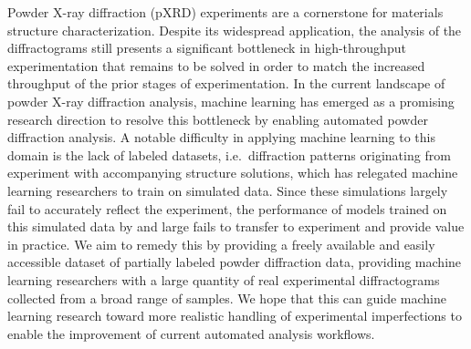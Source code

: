 Powder X-ray diffraction (pXRD) experiments are a cornerstone for materials structure characterization.
Despite its widespread application, the analysis of the diffractograms still presents a significant bottleneck
in high-throughput experimentation that remains to be solved in order to match the increased throughput
of the prior stages of experimentation.
In the current landscape of powder X-ray diffraction analysis, machine learning has emerged as a promising research direction to resolve this bottleneck by enabling automated powder diffraction analysis.
A notable difficulty in applying machine learning to this domain is the lack of labeled datasets, i.e.\
diffraction patterns originating from experiment with accompanying structure solutions, which has relegated machine learning
researchers to train on simulated data.
Since these simulations largely fail to accurately reflect the experiment, the performance of models trained
on this simulated data by and large fails to transfer to experiment and provide value in practice.
We aim to remedy this by providing a freely available and easily accessible dataset of partially labeled
powder diffraction data, providing machine learning researchers with a large quantity of real experimental diffractograms collected from a broad range of samples.
We hope that this can guide machine learning research toward more realistic handling of experimental imperfections to enable the improvement of current automated analysis workflows.